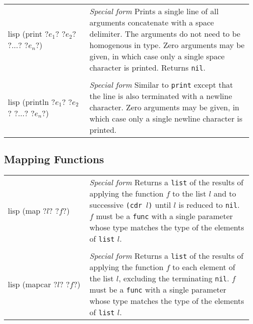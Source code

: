 \documentclass[a4paper, 12pt]{article}
\makeatletter
\newenvironment{funcdefs}
    {\begin{longtable}{@{} x{0.33\linewidth} @{} >{\raggedright\arraybackslash}p{0.66\linewidth} @{}}}
    {\end{longtable}}
\def\specialf/{\textit{Special form}\hspace{0.5em}}
\makeatother
\begin{document}
\begin{funcdefs}
    \begin{minipage}[t]{\linewidth}
        \centering
        \begin{cminted}[autogobble=true, escapeinside=??]{lisp}
            (print ?$e_1$? ?$e_2$? ?$\ldots$? ?$e_n$?)
        \end{cminted}
    \end{minipage}
    & \specialf/ Prints a single line of all arguments concatenate with a space delimiter. The arguments do not need to be homogenous in type. Zero arguments may be given, in which case only a single space character is printed. Returns \texttt{nil}.
    \\ \\
    \begin{minipage}[t]{\linewidth}
        \centering
        \begin{cminted}[autogobble=true, escapeinside=??]{lisp}
            (println ?$e_1$? ?$e_2$? ?$\ldots$? ?$e_n$?)
        \end{cminted}
    \end{minipage}
    & \specialf/ Similar to \texttt{print} except that the line is also terminated with a newline character. Zero arguments may be given, in which case only a single newline character is printed.
\end{funcdefs}

\subsection{Mapping Functions}
\begin{funcdefs}
    \begin{minipage}[t]{\linewidth}
        \centering
        \begin{cminted}[autogobble=true, escapeinside=??]{lisp}
            (map ?$l$? ?$f$?)
        \end{cminted}
    \end{minipage}
    & \specialf/ Returns a \texttt{list} of the results of applying the function $f$ to the list $l$ and to successive \texttt{(cdr $l$)} until $l$ is reduced to \texttt{nil}. $f$ must be a \texttt{func} with a single parameter whose type matches the type of the elements of \texttt{list} $l$.
    \\ \\
    \begin{minipage}[t]{\linewidth}
        \centering
        \begin{cminted}[autogobble=true, escapeinside=??]{lisp}
            (mapcar ?$l$? ?$f$?)
        \end{cminted}
    \end{minipage}
    & \specialf/ Returns a \texttt{list} of the results of applying the function $f$ to each element of the list $l$, excluding the terminating \texttt{nil}. $f$ must be a \texttt{func} with a single parameter whose type matches the type of the elements of \texttt{list} $l$.
\end{funcdefs}
\end{document}
